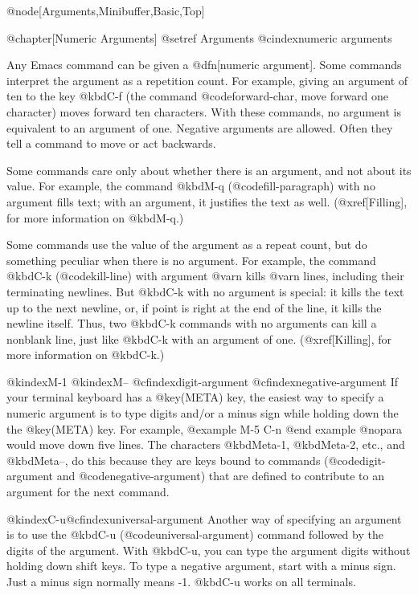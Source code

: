 {{{{@node[Arguments,Minibuffer,Basic,Top]

@chapter[Numeric Arguments]
@setref Arguments
@cindex{numeric arguments}

  Any Emacs command can be given a @dfn[numeric argument].  Some commands
interpret the argument as a repetition count.  For example, giving an
argument of ten to the key @kbd{C-f} (the command
@code{forward-char}, move forward one character) moves forward ten
characters.  With these commands, no argument is equivalent to an
argument of one.  Negative arguments are allowed.  Often they tell
a command to move or act backwards.

  Some commands care only about whether there is an argument, and not about
its value.  For example, the command @kbd{M-q} (@code{fill-paragraph}) with
no argument fills text; with an argument, it justifies the text as well.
(@xref[Filling], for more information on @kbd{M-q}.)

  Some commands use the value of the argument as a repeat count, but do
something peculiar when there is no argument.  For example, the command
@kbd{C-k} (@code{kill-line}) with argument @var{n} kills @var{n} lines,
including their terminating newlines.  But @kbd{C-k} with no argument is
special: it kills the text up to the next newline, or, if point is right at
the end of the line, it kills the newline itself.  Thus, two @kbd{C-k}
commands with no arguments can kill a nonblank line, just like @kbd{C-k}
with an argument of one.  (@xref[Killing], for more information on
@kbd{C-k}.)

@kindex{M-1}
@kindex{M--}
@cfindex{digit-argument}
@cfindex{negative-argument}
  If your terminal keyboard has a @key(META) key, the easiest way to
specify a numeric argument is to type digits and/or a minus sign while
holding down the the @key(META) key.  For example,
@example
M-5 C-n
@end example
@nopara
would move down five lines.  The characters @kbd{Meta-1},
@kbd{Meta-2}, etc., and @kbd{Meta--}, do this because they are keys
bound to commands (@code{digit-argument} and @code{negative-argument})
that are defined to contribute to an argument for the next command.

@kindex{C-u}@cfindex{universal-argument}
  Another way of specifying an argument is to use the @kbd{C-u}
(@code{universal-argument}) command followed by the digits of the argument.
With @kbd{C-u}, you can type the argument digits without holding
down shift keys.  To type a negative argument, start with a minus sign.
Just a minus sign normally means -1.  @kbd{C-u} works on all terminals.

}}}}
